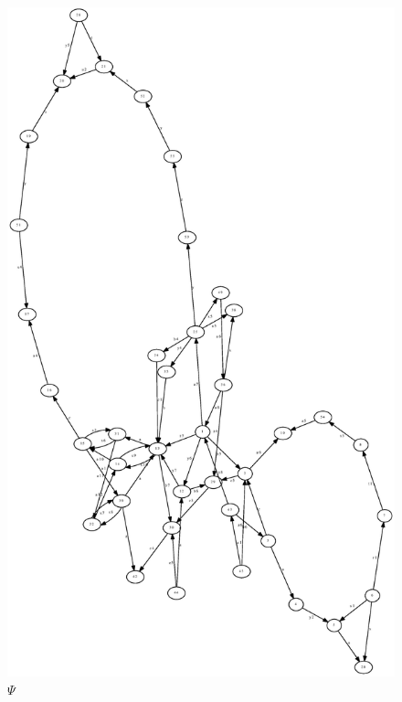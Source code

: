 \documentclass[a4paper,12pt]{article}
\numberwithin{equation}{section}
\numberwithin{figure}{section}
\begin{document}
\begin{figure}
\begin{center}
\includegraphics[width=.99\textwidth, height=.8\textheight, keepaspectratio=false]{python/ex_K_reassembly.eps}
\caption{$\Psi$}
\label{fig:out}
\end{center}
\end{figure}
\end{document}
